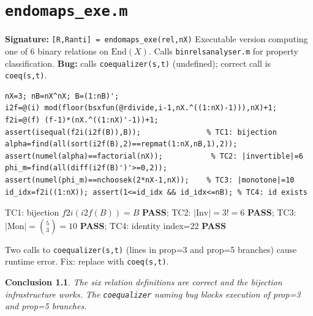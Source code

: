 \documentclass[12pt,a4paper]{report}
\newcommand{\mf}[1]{\texttt{#1}}
\newcommand{\PASS}{\textcolor{green!60!black}{\textbf{PASS}}}
\newtheorem{concl}{Conclusion}[chapter]
\begin{document}
\chapter{\mf{endomaps\_exe.m}}
\begin{tcolorbox}[Abox,title=Analysis]
\textbf{Signature:} \lstinline|[R,Ranti] = endomaps_exe(rel,nX)|\quad
Executable version computing one of 6 binary relations on $\mathrm{End}(X)$. Calls \mf{binrelsanalyser.m} for property classification. \textbf{Bug:} calls \mf{coequalizer(s,t)} (undefined); correct call is \mf{coeq(s,t)}.
\end{tcolorbox}
\begin{lstlisting}[caption={Tests for endomaps\_exe.m -- bijection and invertibles}]
nX=3; nB=nX^nX; B=(1:nB)';
i2f=@(i) mod(floor(bsxfun(@rdivide,i-1,nX.^((1:nX)-1))),nX)+1;
f2i=@(f) (f-1)*(nX.^((1:nX)'-1))+1;
assert(isequal(f2i(i2f(B)),B));               % TC1: bijection
alpha=find(all(sort(i2f(B),2)==repmat(1:nX,nB,1),2));
assert(numel(alpha)==factorial(nX));           % TC2: |invertible|=6
phi_m=find(all(diff(i2f(B)')'>=0,2));
assert(numel(phi_m)==nchoosek(2*nX-1,nX));    % TC3: |monotone|=10
id_idx=f2i((1:nX)); assert(1<=id_idx && id_idx<=nB); % TC4: id exists
\end{lstlisting}
\begin{tcolorbox}[Pbox,title=TC1--TC4 -- All pass]
TC1: bijection $f2i(i2f(B))=B$ \PASS; TC2: $|\mathrm{Inv}|=3!=6$ \PASS; TC3: $|\mathrm{Mon}|=\binom{5}{3}=10$ \PASS; TC4: identity index=22 \PASS
\end{tcolorbox}
\begin{tcolorbox}[Bbox,title=Bug: \texttt{coequalizer} undefined]
Two calls to \mf{coequalizer(s,t)} (lines in prop=3 and prop=5 branches) cause runtime error. Fix: replace with \mf{coeq(s,t)}.
\end{tcolorbox}
\begin{concl}
The six relation definitions are correct and the bijection infrastructure works. The \mf{coequalizer} naming bug blocks execution of prop=3 and prop=5 branches.
\end{concl}

\end{document}
